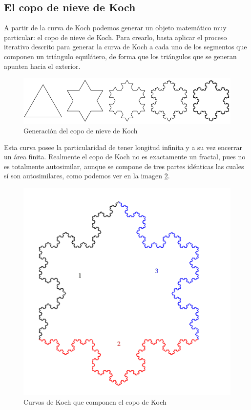 \subsection{El copo de nieve de Koch}
\label{subsection:copo-Koch}

A partir de la curva de Koch podemos generar un objeto matemático muy particular: el copo de nieve de Koch. Para crearlo, basta aplicar el proceso iterativo descrito para generar la curva de Koch a cada uno de los segmentos que componen un triángulo equilátero, de forma que los triángulos que se generan apunten hacia el exterior.


\begin{figure} [h]
\centering
\includegraphics[scale = 0.6]{img/copo-Koch.png}
\caption{Generación del copo de nieve de Koch}
\label{fig:copo-Koch}
\end{figure}

Esta curva posee la particularidad de tener longitud infinita y a su vez encerrar un área finita. Realmente el copo de Koch no es exactamente un fractal, pues no es totalmente autosimilar, aunque se compone de tres partes idénticas las cuales sí son autosimilares, como podemos ver en la imagen \ref{fig:copo-Koch-colores}.

\begin{figure} [h]
\centering
\includegraphics[scale = 0.2]{img/copo-Koch-colores.png}
\caption{Curvas de Koch que componen el copo de Koch}
\label{fig:copo-Koch-colores}
\end{figure}

